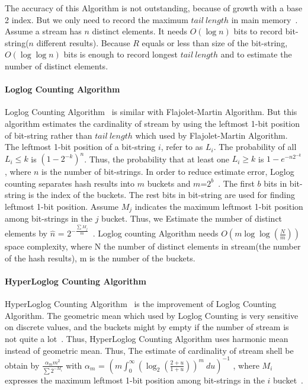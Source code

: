 The accuracy of this Algorithm is not outstanding, because of growth with a base
2 index. But we only need to record the maximum $tail\ length$ in main
memory~\cite{leskovec2014mining}. Assume a stream has $n$ distinct elements. It
needs $O(\log n)$ bits to record bit-string($n$ different results). Because $R$
equals or less than size of the bit-string, $O(\log\log n)$ bits is enough to
record longest $tail\ length$ and to estimate the number of distinct elements. 
\paragraph{Loglog Counting Algorithm}

Loglog Counting Algorithm~\cite{durand2003loglog} is similar with
Flajolet-Martin Algorithm. But this algorithm estimates the cardinality of
stream by using the leftmost 1-bit position of bit-string rather than $tail \
length$ which used by Flajolet-Martin Algorithm. The leftmost 1-bit position of
a bit-string $i$, refer to as $L_i$. The probability of all $L_i \leq k$ is
$(1-2^{-k})^n$. Thus, the probability that at least one $L_i \geqslant k$ is
$1-e^{-n2^{-k}}$, where $n$ is the number of bit-strings. In order to reduce
estimate error, Loglog counting separates hash results into $m$ buckets and
$m$=$2^b$~\cite{durand2003loglog}. The first $b$ bits in bit-string is the index
of the buckets. The rest bits in bit-string are used for finding leftmost 1-bit
position. Assume $M_j$ indicates the maximum leftmost 1-bit position among
bit-strings in the $j$ bucket. Thus, we Estimate the number of distinct elements
by $\hat{n}$ = $2^{-\frac{\sum M_j}{m}}$~\cite{durand2003loglog}. Loglog
counting Algorithm needs $O(m \log\log(\frac{N}{m}))$ space complexity, where N
the number of distinct elements in stream(the number of the hash results), m is
the number of the buckets. 

\paragraph{HyperLoglog Counting Algorithm}

HyperLoglog Counting Algorithm~\cite{flajolet2007hyperloglog} is the improvement
of Loglog Counting Algorithm. The geometric mean which used by Loglog Counting
is very sensitive on discrete values, and the buckets might by empty if the
number of stream is not quite a lot~\cite{flajolet2007hyperloglog}. Thus,
HyperLoglog Counting Algorithm uses harmonic mean instead of geometric mean.
Thus, The estimate of cardinality of stream shell be obtain by $\frac{\alpha_m
m^2 }{\sum 2^{-M_i}}$ with $\alpha_m$ = $(m
\int_0^\infty(\log_2(\frac{2+u}{1+u}))^m\ du)^{-1}$ , where $M_i$ expresses the
maximum leftmost 1-bit position among bit-strings in the $i$
bucket~\cite{flajolet2007hyperloglog}.

